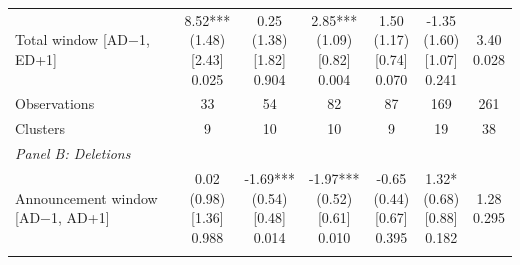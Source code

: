 \begin{threeparttable}
\begin{tabular}{@{}lcccccc}
Total window [AD$-$1, ED+1] & \makecell{8.52***\\(1.48)\\{}[2.43]\\{0.025}} & \makecell{0.25\\(1.38)\\{}[1.82]\\{0.904}} & \makecell{2.85***\\(1.09)\\{}[0.82]\\{0.004}} & \makecell{1.50\\(1.17)\\{}[0.74]\\{0.070}} & \makecell{-1.35\\(1.60)\\{}[1.07]\\{0.241}} & \makecell{3.40\\{0.028}} \\
\addlinespace[0.25ex]
\addlinespace[0.25ex]
Observations & 33 & 54 & 82 & 87 & 169 & 261 \\
\addlinespace[0.25ex]
\addlinespace[0.25ex]
Clusters & 9 & 10 & 10 & 9 & 19 & 38 \\
\addlinespace[0.25ex]
\midrule
\emph{Panel B: Deletions} \\
\addlinespace[0.25ex]
\addlinespace[1ex]
Announcement window [AD$-$1, AD+1] & \makecell{0.02\\(0.98)\\{}[1.36]\\{0.988}} & \makecell{-1.69***\\(0.54)\\{}[0.48]\\{0.014}} & \makecell{-1.97***\\(0.52)\\{}[0.61]\\{0.010}} & \makecell{-0.65\\(0.44)\\{}[0.67]\\{0.395}} & \makecell{1.32*\\(0.68)\\{}[0.88]\\{0.182}} & \makecell{1.28\\{0.295}} \\
\addlinespace[0.25ex]
\addlinespace[0.25ex]

\end{tabular}
\end{threeparttable}
